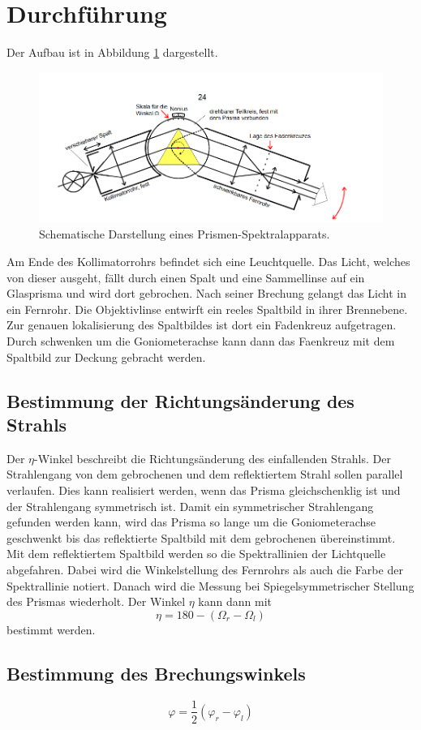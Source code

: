 \section{Durchführung}
\label{sec:Durchführung}
Der Aufbau ist in Abbildung \ref{fig:spek} dargestellt.
\begin{figure}[H]
  \centering
  \includegraphics[scale=0.4]{content/pris_spek.png}
  \caption{Schematische Darstellung eines Prismen-Spektralapparats\cite{v402}.}
  \label{fig:spek}
\end{figure}
\noindent Am Ende des Kollimatorrohrs befindet sich eine Leuchtquelle.
Das Licht, welches von dieser ausgeht, fällt durch einen Spalt und eine Sammellinse auf ein Glasprisma und wird dort gebrochen.
Nach seiner Brechung gelangt das Licht in ein Fernrohr.
Die Objektivlinse entwirft ein reeles Spaltbild in ihrer Brennebene.
Zur genauen lokalisierung des Spaltbildes ist dort ein Fadenkreuz aufgetragen.
Durch schwenken um die Goniometerachse kann dann das Faenkreuz mit dem Spaltbild zur Deckung gebracht werden.
\subsection{Bestimmung der Richtungsänderung des Strahls}
Der $\eta$-Winkel beschreibt die Richtungsänderung des einfallenden Strahls.
Der Strahlengang von dem gebrochenen und dem reflektiertem Strahl sollen parallel verlaufen.
Dies kann realisiert werden, wenn das Prisma gleichschenklig ist und der Strahlengang symmetrisch ist.
Damit ein symmetrischer Strahlengang gefunden werden kann, wird das Prisma so lange um die Goniometerachse geschwenkt bis das reflektierte Spaltbild mit dem gebrochenen übereinstimmt.
Mit dem reflektiertem Spaltbild werden so die Spektrallinien der Lichtquelle abgefahren.
Dabei wird die Winkelstellung des Fernrohrs als auch die Farbe der Spektrallinie notiert.
Danach wird die Messung bei Spiegelsymmetrischer Stellung des Prismas wiederholt.
Der Winkel $\eta$ kann dann mit
\begin{equation}
  \label{eq:eta}
  \eta = 180 -(\Omega_r - \Omega_l)
\end{equation}
bestimmt werden.
\subsection{Bestimmung des Brechungswinkels}
\begin{equation}
  \label{eq:phi}
  \varphi = \frac{1}{2}(\varphi_r -\varphi_l)
\end{equation}
